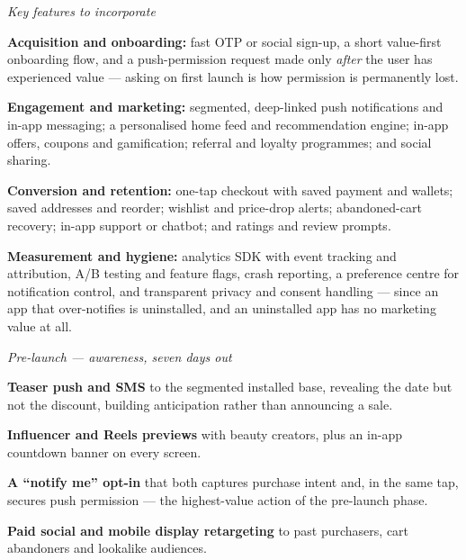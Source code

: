 \begin{qlist}
\textit{Key features to incorporate}
\begin{apts}\setcounter{enumi}{8}
\item \textbf{Acquisition and onboarding:} fast OTP or social sign-up, a short
      value-first onboarding flow, and a push-permission request made only
      \emph{after} the user has experienced value --- asking on first launch is
      how permission is permanently lost.
\item \textbf{Engagement and marketing:} segmented, deep-linked push
      notifications and in-app messaging; a personalised home feed and
      recommendation engine; in-app offers, coupons and gamification;
      referral and loyalty programmes; and social sharing.
\item \textbf{Conversion and retention:} one-tap checkout with saved payment
      and wallets; saved addresses and reorder; wishlist and price-drop alerts;
      abandoned-cart recovery; in-app support or chatbot; and ratings and
      review prompts.
\item \textbf{Measurement and hygiene:} analytics SDK with event tracking and
      attribution, A/B testing and feature flags, crash reporting, a preference
      centre for notification control, and transparent privacy and consent
      handling --- since an app that over-notifies is uninstalled, and an
      uninstalled app has no marketing value at all.
\end{apts}

\textit{Pre-launch --- awareness, seven days out}
\begin{apts}
\item \textbf{Teaser push and SMS} to the segmented installed base, revealing
      the date but not the discount, building anticipation rather than
      announcing a sale.
\item \textbf{Influencer and Reels previews} with beauty creators, plus an
      in-app countdown banner on every screen.
\item \textbf{A ``notify me'' opt-in} that both captures purchase intent and, in
      the same tap, secures push permission --- the highest-value action of the
      pre-launch phase.
\item \textbf{Paid social and mobile display retargeting} to past purchasers,
      cart abandoners and lookalike audiences.
\end{apts}


\end{qlist}

